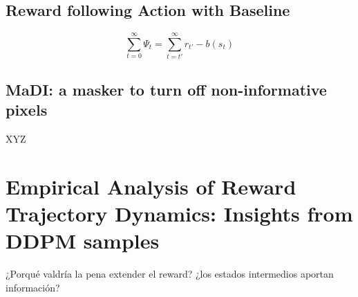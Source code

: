 \subsection{Reward following Action with Baseline}

\begin{equation}\label{eqn:psi-reward-following-action-baseline}
  \sum_{t=0}^{\infty}\Psi_{t} = \sum_{t=t'}^{\infty} r_{t'} - b(s_{t})
\end{equation}


\subsection{MaDI: a masker to turn off non-informative pixels}

XYZ

\section{Empirical Analysis of Reward Trajectory Dynamics: Insights from DDPM samples}

¿Porqué valdría la pena extender el reward? ¿los estados intermedios 
aportan información?

